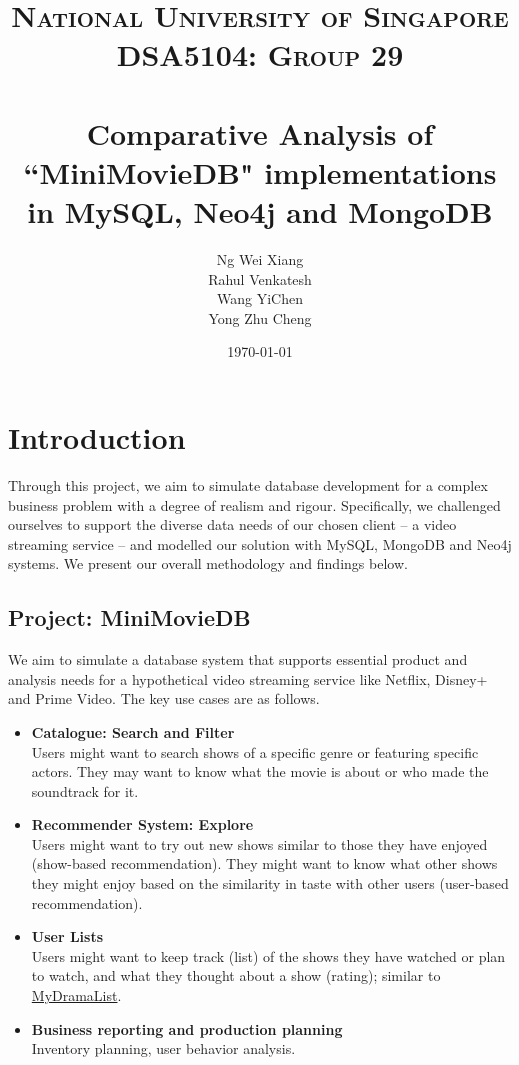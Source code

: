 \documentclass[10pt,titlepage]{article}
\title{
    \textsc{\LARGE National University of Singapore}\\[1cm]
    \textsc{\Large DSA5104: Group 29}\\[2cm]


    \HRule\\[0.4cm]
    \huge{Comparative Analysis of ``MiniMovieDB" implementations in MySQL, Neo4j and MongoDB}
    \HRule\\[1.5cm]
}
\author{\begin{tabular}{rl}
        Ng Wei Xiang & \\
        Rahul Venkatesh & \\
        Wang YiChen & \\
        Yong Zhu Cheng & 
\end{tabular}}
\date{\vfill\today}
\begin{document}
\maketitle
\tableofcontents
\pagebreak

\section{Introduction}
Through this project, we aim to simulate database development for a complex business problem with a degree of realism
and rigour. Specifically, we challenged ourselves to support the diverse data needs of our chosen client -- a video
streaming service -- and modelled our solution with MySQL, MongoDB and Neo4j systems. We present our overall methodology
and findings below.

\subsection{Project: MiniMovieDB}

We aim to simulate a database system that supports essential product and analysis needs for a hypothetical video
streaming service like Netflix, Disney+ and Prime Video. The key use cases are as follows.

\begin{itemize}
    \item \textbf{Catalogue: Search and Filter} \\
        Users might want to search shows of a specific genre or featuring specific actors. They may want to know what the
        movie is about or who made the soundtrack for it.
    \item \textbf{Recommender System: Explore} \\
        Users might want to try out new shows similar to those they have enjoyed (show-based recommendation). They might
        want to know what other shows they might enjoy based on the similarity in taste with other users (user-based
        recommendation).
    \item \textbf{User Lists} \\
        Users might want to keep track (list) of the shows they have watched or plan to watch, and what they thought
        about a show (rating); similar to \href{https://mydramalist.com/}{MyDramaList}.
    \item \textbf{Business reporting and production planning} \\
        Inventory planning, user behavior analysis.
\end{itemize}
\end{document}
